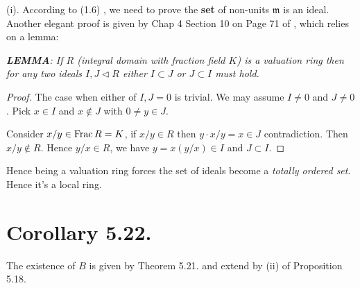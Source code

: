 (i). According to (1.6) \cite{atiyah1994introduction}, we need to prove the \textbf{set} of non-units $\mathfrak m$  is an ideal. Another elegant proof is given by Chap 4 Section 10 on Page 71 of \cite{matsumura1989commutative}, which relies on a lemma: 

\textit{\textbf{LEMMA}: If $R$ (integral domain with fraction field $K$) is a valuation ring then for any two ideals $I,J\triangleleft R$ either $I\subset J$ or $J\subset I$ must hold.}
\begin{proof}
	The case when either of $I,J=0$ is trivial. We may assume $I\neq 0$ and $J\neq 0$. Pick $x\in I$ and $x\notin J$ with $0\neq y\in J$. 

	Consider $x/y\in \operatorname{Frac} R=K$, if $x/y\in R$ then $y\cdot x/y=x\in J$ contradiction. Then $x/y\notin R$. Hence $y/x\in R$, we have $y=x(y/x)\in I$ and $J\subset I$.
\end{proof}

Hence being a valuation ring forces the set of ideals become a \textit{totally ordered set}. Hence it's a local ring.

\section{Corollary 5.22.}

The existence of $B$ is given by Theorem 5.21. and extend by (ii) of Proposition 5.18.